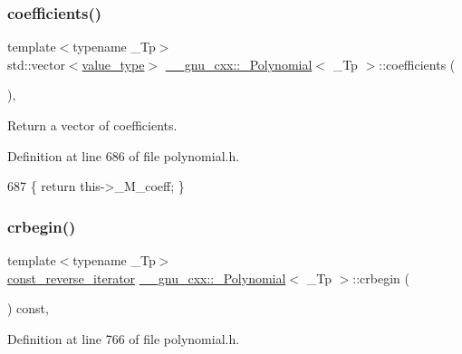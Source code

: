 \subsubsection{\texorpdfstring{coefficients()}{coefficients()}\hspace{0.1cm}{\footnotesize\ttfamily [2/2]}}
{\footnotesize\ttfamily template$<$typename \+\_\+\+Tp$>$ \\
std\+::vector$<$\hyperlink{class____gnu__cxx_1_1__Polynomial_a725563351f50e76084a7a016c06f8a53}{value\+\_\+type}$>$ \hyperlink{class____gnu__cxx_1_1__Polynomial}{\+\_\+\+\_\+gnu\+\_\+cxx\+::\+\_\+\+Polynomial}$<$ \+\_\+\+Tp $>$\+::coefficients (\begin{DoxyParamCaption}{ }\end{DoxyParamCaption})\hspace{0.3cm}{\ttfamily [inline]}, {\ttfamily [noexcept]}}

Return a vector of coefficients. 

Definition at line 686 of file polynomial.\+h.


\begin{DoxyCode}
687       \{ \textcolor{keywordflow}{return} this->\_M\_coeff; \}
\end{DoxyCode}
\mbox{\label{class____gnu__cxx_1_1__Polynomial_a263b74157472085ae2fb01957a5bda5e}} 
\subsubsection{\texorpdfstring{crbegin()}{crbegin()}}
{\footnotesize\ttfamily template$<$typename \+\_\+\+Tp$>$ \\
\hyperlink{class____gnu__cxx_1_1__Polynomial_a2a042a80127ab9a7b0349a54791e59af}{const\+\_\+reverse\+\_\+iterator} \hyperlink{class____gnu__cxx_1_1__Polynomial}{\+\_\+\+\_\+gnu\+\_\+cxx\+::\+\_\+\+Polynomial}$<$ \+\_\+\+Tp $>$\+::crbegin (\begin{DoxyParamCaption}{ }\end{DoxyParamCaption}) const\hspace{0.3cm}{\ttfamily [inline]}, {\ttfamily [noexcept]}}



Definition at line 766 of file polynomial.\+h.


